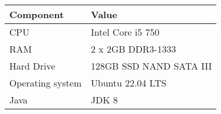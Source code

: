 \begin{tabular}{ll}
\hline
\multicolumn{1}{l}{Component} & Value                        \\
\hline
CPU                           & Intel Core i5 750       \\
RAM                           & 2 x 2GB DDR3-1333       \\
Hard Drive                    & 128GB SSD NAND SATA III \\
Operating system              & Ubuntu 22.04 LTS        \\
Java                          & JDK 8                   \\
\hline
\end{tabular}